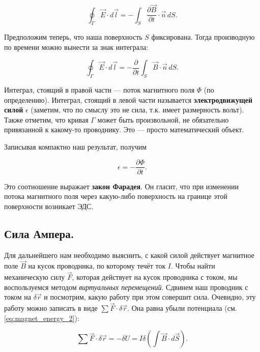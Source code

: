 \documentclass[11pt,a4paper]{article}
\numberwithin{equation}{section}
\newcommand{\pt}{\partial}
\newcommand{\eps}{\epsilon}
\begin{document}
\begin{equation}
  \label{eq:der_faraday_2}
  \oint_{\Gamma} \vec{E} \cdot d \vec{l} = - \int_S \frac{\pt
    \vec{B}}{\pt t} \cdot \vec{n}\, dS.
\end{equation}

Предположим теперь, что наша поверхность $S$ фиксирована. Тогда
производную по времени можно вынести за знак интеграла:

\begin{equation}
  \label{eq:der_faraday_3}
  \oint_{\Gamma} \vec{E} \cdot d \vec{l} = - \frac{\pt}{\pt t} \int_S
  \vec{B} \cdot \vec{n}\, dS.
\end{equation}

Интеграл, стоящий в правой части --- поток магнитного поля $\Phi$ (по
определению). Интеграл, стоящий в левой части называется
\textbf{электродвижущей силой} $\eps$ (заметим, что по смыслу это не сила,
т.к. имеет размерность вольт). Также отметим, что кривая $\Gamma$
может быть произвольной, не обязательно привязанной к какому-то
проводнику. Это --- просто математический объект. 

Записывая компактно наш результат, получим

\begin{equation}
  \label{eq:faradays_law}
  \eps = - \frac{\pt \Phi}{\pt t}.
\end{equation}

Это соотношение выражает \textbf{закон Фарадея}. Он гласит, что при
изменении потока магнитного поля через какую-либо поверхность на
границе этой поверхности возникает ЭДС.

\subsection{Сила Ампера.}
\label{sec:amperes_force}

Для дальнейшего нам необходимо выяснить, с какой силой действует
магнитное поле $\vec{B}$ на кусок проводника, по которому течёт ток
$I$. Чтобы найти механическую силу $\vec{F}$, которая действует на
кусок проводника с током, мы воспользуемся методом \textit{виртуальных
  перемещений}. Сдвинем наш проводник с током на $\delta \vec{r}$ и
посмотрим, какую работу при этом совершит сила. Очевидно, эту работу
можно записать в виде $\sum \vec{F} \cdot \delta \vec{r}$. Она равна
убыли потенциала (см. \eqref{eq:magnet_energy_2}):

\begin{equation}
  \label{eq:der_amperes_force_1}
 \sum \vec{F} \cdot \delta \vec{r} = -\delta U = I \delta \left( \int \vec{B}  \cdot d\vec{S}\right). 
\end{equation}
\end{document}
